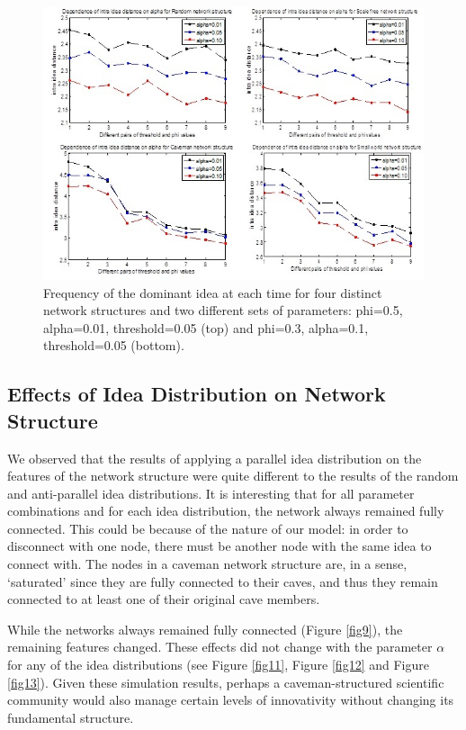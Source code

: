 \begin{figure}
[htp]
\begin{center}
\includegraphics{Fig2}
\end{center}
\caption{Frequency of the dominant idea at each time for four distinct network structures and two different sets of parameters: phi=0.5, alpha=0.01, threshold=0.05 (top) and phi=0.3, alpha=0.1, threshold=0.05 (bottom).}
\label {fig2}
\end{figure}




\subsection{Effects of Idea Distribution on Network Structure}


We observed that the results of applying a parallel idea distribution on the features of the network structure were quite different to the results of the random and anti-parallel idea distributions. It is interesting that for all parameter combinations and for each idea distribution, the network always remained fully connected. This could be because of the nature of our model: in order to disconnect with one node, there must be another node with the same idea to connect with. The nodes in a caveman network structure are, in a sense, `saturated' since they are fully connected to their caves, and thus they remain connected to at least one of their original cave members. 

While the networks always remained fully connected (Figure \ref{fig9}), the remaining features changed. These effects did not change with the parameter $\alpha$ for any of the idea distributions (see Figure \ref{fig11}, Figure \ref{fig12} and Figure \ref{fig13}). Given these simulation results, perhaps a caveman-structured scientific community would also manage certain levels of innovativity without changing its fundamental structure.

